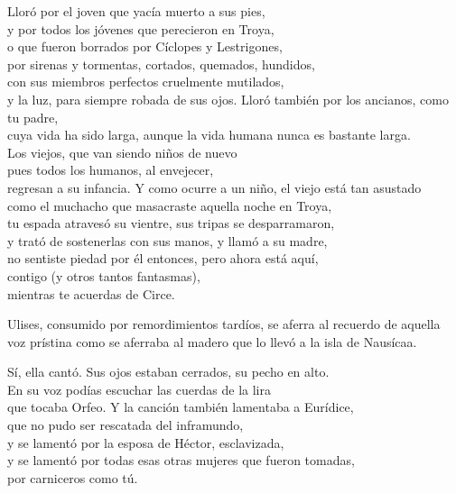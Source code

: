 \begin{versopropio}
Lloró por el joven que yacía muerto a sus pies,\\
y por todos los jóvenes que perecieron en Troya,\\
o que fueron borrados por Cíclopes y Lestrigones,\\
por sirenas y tormentas, cortados, quemados, hundidos,\\
con sus miembros perfectos cruelmente mutilados,\\
y la luz, para siempre robada de sus ojos.
\stanzabreak
Lloró también por los ancianos, como tu padre,\\
cuya vida ha sido larga,
\stanzabreak
aunque la vida humana nunca es bastante larga.\\
Los viejos, que van siendo niños de nuevo\\
pues todos los humanos, al envejecer,\\
regresan a su infancia.
\stanzabreak
Y como ocurre a un niño, el viejo está tan asustado\\
como el muchacho que masacraste aquella noche en Troya,\\
tu espada atravesó su vientre, sus tripas se desparramaron,\\
y trató de sostenerlas con sus manos, y llamó a su madre,\\
no sentiste piedad por él entonces, pero ahora está aquí,\\
contigo (y otros tantos fantasmas),\\
mientras te acuerdas de Circe.
\end{versopropio}

Ulises, consumido por remordimientos tardíos, se aferra al recuerdo de aquella voz prístina como se aferraba al madero que lo llevó a la isla de Nausícaa.

\begin{versopropio}
Sí, ella cantó. Sus ojos estaban cerrados, su pecho en alto.\\
En su voz podías escuchar las cuerdas de la lira\\
que tocaba Orfeo. Y la canción también lamentaba a Eurídice,\\
que no pudo ser rescatada del inframundo,\\
y se lamentó por la esposa de Héctor, esclavizada,\\
y se lamentó por todas esas otras mujeres que fueron tomadas,\\
por carniceros como tú.
\end{versopropio}

